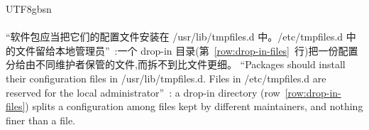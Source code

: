 \begin{CJK*}{UTF8}{gbsn}
\paragraph{}
\ifPaperChinese
``软件包应当把它们的配置文件安装在 /usr/lib/tmpfiles.d 中。/etc/tmpfiles.d 中的文件留给本地管理员''~\cite{systemd-contributors-tmpfiles-d}:一个 drop-in 目录(第~\ref{row:drop-in-files}~行)把一份配置分给由不同维护者保管的文件,而拆不到比文件更细。
\else
``Packages should install their configuration files in /usr/lib/tmpfiles.d. Files in /etc/tmpfiles.d are
reserved for the local administrator''~\cite{systemd-contributors-tmpfiles-d}: a drop-in directory
(row~\ref{row:drop-in-files}) splits a configuration among files kept by different maintainers, and
nothing finer than a file.
\fi


\end{CJK*}
